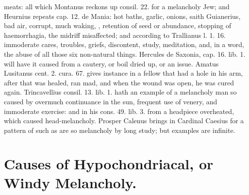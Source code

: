 {meats: all which Montanus reckons up consil. 22. for a melancholy Jew;
and Heurnius repeats cap. 12. de Mania: hot baths, garlic, onions,
saith Guianerius, bad air, corrupt, much waking, \etc{}, retention
of seed or abundance, stopping of haemorrhagia, the midriff
misaffected; and according to Trallianus l. 1. 16. immoderate cares,
troubles, griefs, discontent, study, meditation, and, in a word, the
abuse of all those six non-natural things. Hercules de Saxonia, cap.
16. lib. 1. will have it caused from a cautery, or boil dried up,
or an issue. Amatus Lusitanus cent. 2. cura. 67. gives instance in a
fellow that had a hole in his arm, after that was healed, ran
mad, and when the wound was open, he was cured again. Trincavellius
consil. 13. lib. 1. hath an example of a melancholy man so caused by
overmuch continuance in the sun, frequent use of venery, and immoderate
exercise: and in his cons. 49. lib. 3. from a headpiece
overheated, which caused head-melancholy. Prosper Calenus brings in
Cardinal Caesius for a pattern of such as are so melancholy by long
study; but examples are infinite.

\section{Causes of Hypochondriacal, or Windy Melancholy.}

}
